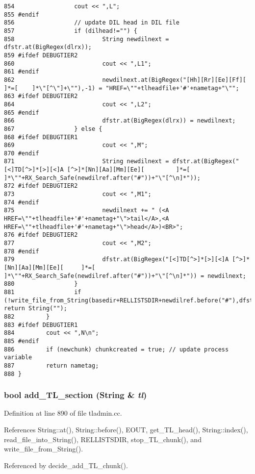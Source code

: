 \begin{verbatim}
854                 cout << ",L";
855 #endif
856                 // update DIL head in DIL file
857                 if (dilhead!="") {
858                         String newdilnext = dfstr.at(BigRegex(dlrx)); 
859 #ifdef DEBUGTIER2
860                         cout << ",L1";
861 #endif
862                         newdilnext.at(BigRegex("[Hh][Rr][Ee][Ff][       ]*=[    ]*\"[^\"]+\""),-1) = "HREF=\""+tlheadfile+'#'+nametag+"\"";
863 #ifdef DEBUGTIER2
864                         cout << ",L2";
865 #endif
866                         dfstr.at(BigRegex(dlrx)) = newdilnext;
867                 } else {
868 #ifdef DEBUGTIER1
869                         cout << ",M";
870 #endif
871                         String newdilnext = dfstr.at(BigRegex("[<]TD[^>]*[>][<]A [^>]*[Nn][Aa][Mm][Ee][         ]*=[    ]*\""+RX_Search_Safe(newdilref.after("#"))+"\"[^\n]*"));
872 #ifdef DEBUGTIER2
873                         cout << ",M1";
874 #endif
875                         newdilnext += " (<A HREF=\""+tlheadfile+'#'+nametag+"\">tail</A>,<A HREF=\""+tlheadfile+'#'+nametag+"\">head</A>)<BR>";
876 #ifdef DEBUGTIER2
877                         cout << ",M2";
878 #endif
879                         dfstr.at(BigRegex("[<]TD[^>]*[>][<]A [^>]*[Nn][Aa][Mm][Ee][     ]*=[    ]*\""+RX_Search_Safe(newdilref.after("#"))+"\"[^\n]*")) = newdilnext;
880                 }
881                 if (!write_file_from_String(basedir+RELLISTSDIR+newdilref.before("#"),dfstr,"DIL")) return String("");
882         }
883 #ifdef DEBUGTIER1
884         cout << ",N\n";
885 #endif
886         if (newchunk) chunkcreated = true; // update process variable
887         return nametag;
888 }
\end{verbatim}\normalsize 
{}
\subsubsection{\setlength{\rightskip}{0pt plus 5cm}bool add\_\-TL\_\-section ({\bf String} \& {\em tl})}\label{dil2al_8hh_a326}




Definition at line 890 of file tladmin.cc.

References String::at(), String::before(), EOUT, get\_\-TL\_\-head(), String::index(), read\_\-file\_\-into\_\-String(), RELLISTSDIR, stop\_\-TL\_\-chunk(), and write\_\-file\_\-from\_\-String().

Referenced by decide\_\-add\_\-TL\_\-chunk().



